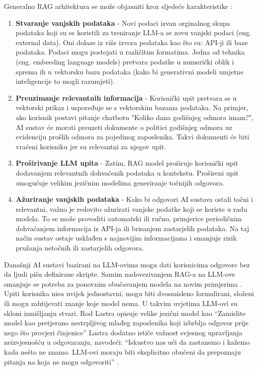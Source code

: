 \documentclass[]{foi}
\begin{document}
Generalno RAG arhitektura se može objasniti kroz sljedeće karakteristike \cite{awsRAG2025}:

\begin{enumerate}
    \item \textbf{Stvaranje vanjskih podataka} - Novi podaci izvan orginalnog skupa podataka koji su se koristili za treniranje LLM-a se zovu 
    vanjski podaci (eng. external data). Oni dolaze iz više izvora podataka kao što su: API-ji ili baze podataka. Podaci mogu postojati u različitim formatima.
    Jedna od tehnika (eng. embeeding language models) pretvara podatke u numerički oblik i sprema ih u vektorsku bazu podataka 
    (kako bi generativni modeli umjetne inteligencije to mogli razumjeti).
    \item \textbf{Preuzimanje relevantnih informacija} - Korisnički upit pretvara se u vektorski prikaz i uspoređuje se s vektorskim bazama podataka.
    Na primjer, ako korisnik postavi pitanje chatbotu "Koliko dana godišnjeg odmora imam?", AI sustav će morati preuzeti dokumente o politici godišnjeg 
    odmora uz evidenciju prošlih odmora za pojedinog zaposlenika. Takvi dokumenti će biti vraćeni korisniku jer su relevantni za njegov upit.
    \item \textbf{Proširivanje LLM upita} - Zatim, RAG model proširuje korisnički upit dodavanjem relevantnih dohvaćenih podataka u kontekstu. 
    Prošireni upit omogućuje velikim jezičnim modelima generiranje točnijih odgovora.
    \item \textbf{Ažuriranje vanjskih podataka} - Kako bi odgovori AI sustava ostali točni i relevantni, važno je redovito ažurirati vanjske podatke koji se koriste u radu modela.
    To se može provoditi automatski ili ručno, primjerice periodičnim dohvaćanjem informacija iz API-ja ili brisanjem zastarjelih podataka. Na taj način sustav ostaje usklađen s najnovijim
    informacijama i smanjuje rizik pružanja netočnih ili zastarjelih odgovora. 
\end{enumerate}

Današnji AI sustavi bazirani na LLM-ovima mogu dati korisnicima odgovore bez da ljudi pišu definirane skripte. Samim nadovezivanjem RAG-a na LLM-ove smanjuje se potreba za ponovnim obučavanjem 
modela na novim primjerima \cite{ibmRAG}. Upiti korisnika nisu uvijek jednostavni, mogu biti dvosmisleno formulirani, složeni ili mogu zahtijevati znanje koje model nema. U takvim uvjetima 
LLM-ovi su skloni izmišljanju stvari. Rod Lastra opisuje velike jezični model kao “Zamislite model kao pretjerano nestrpljivog mlađeg zaposlenika koji izbrblja odgovor prije nego što provjeri činjenice” \cite{ibmRAG}
Lastra dodatno ističe važnost svjesnog upravljanja neizvjesnošću u odgovaranju, navodeći: “Iskustvo nas uči da zastanemo i kažemo kada nešto ne znamo. LLM-ovi moraju biti eksplicitno obučeni da prepoznaju pitanja na koja ne mogu odgovoriti” \cite{ibmRAG}. 
\end{document}
